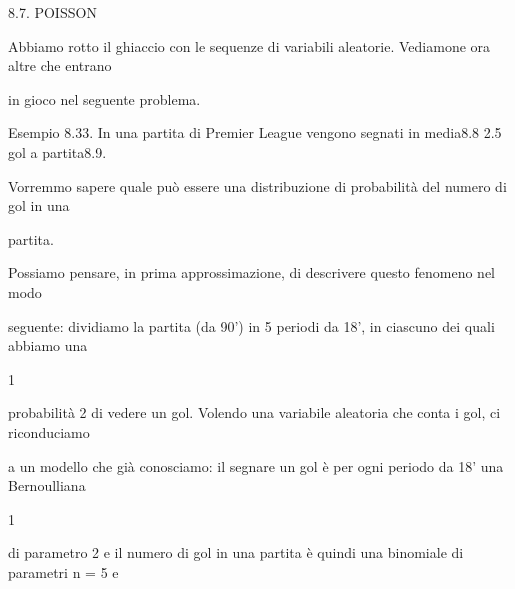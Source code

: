 \documentclass[a4paper,portrait,12pt]{article}
\begin{document}
\begin{flushleft}
8.7. POISSON
\end{flushleft}


\begin{flushleft}
Abbiamo rotto il ghiaccio con le sequenze di variabili aleatorie. Vediamone ora altre che entrano
\end{flushleft}


\begin{flushleft}
in gioco nel seguente problema.
\end{flushleft}


\begin{flushleft}
Esempio 8.33. In una partita di Premier League vengono segnati in media8.8 2.5 gol a partita8.9.
\end{flushleft}


\begin{flushleft}
Vorremmo sapere quale pu\`{o} essere una distribuzione di probabilit\`{a} del numero di gol in una
\end{flushleft}


\begin{flushleft}
partita.
\end{flushleft}


\begin{flushleft}
Possiamo pensare, in prima approssimazione, di descrivere questo fenomeno nel modo
\end{flushleft}


\begin{flushleft}
seguente: dividiamo la partita (da 90') in 5 periodi da 18', in ciascuno dei quali abbiamo una
\end{flushleft}


1


\begin{flushleft}
probabilit\`{a} 2 di vedere un gol. Volendo una variabile aleatoria che conta i gol, ci riconduciamo
\end{flushleft}


\begin{flushleft}
a un modello che gi\`{a} conosciamo: il segnare un gol \`{e} per ogni periodo da 18' una Bernoulliana
\end{flushleft}


1


\begin{flushleft}
di parametro 2 e il numero di gol in una partita \`{e} quindi una binomiale di parametri n = 5 e
\end{flushleft}
\end{document}
